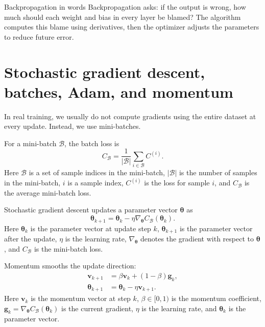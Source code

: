 \documentclass[11pt]{article}
\newcommand{\btheta}{\bm{\theta}}
\begin{document}
\begin{keybox}{Backpropagation in words}
Backpropagation asks: if the output is wrong, how much should each weight and bias in every layer be blamed?  The algorithm computes this blame using derivatives, then the optimizer adjusts the parameters to reduce future error.
\end{keybox}

\section{Stochastic gradient descent, batches, Adam, and momentum}

In real training, we usually do not compute gradients using the entire dataset at every update.  Instead, we use mini-batches.

For a mini-batch $\mathcal{B}$, the batch loss is
\begin{equation}
    C_{\mathcal{B}} = \frac{1}{|\mathcal{B}|}\sum_{i\in\mathcal{B}} C^{(i)}.
    \label{eq:batch_loss}
\end{equation}
Here $\mathcal{B}$ is a set of sample indices in the mini-batch, $|\mathcal{B}|$ is the number of samples in the mini-batch, $i$ is a sample index, $C^{(i)}$ is the loss for sample $i$, and $C_{\mathcal{B}}$ is the average mini-batch loss.

Stochastic gradient descent updates a parameter vector $\btheta$ as
\begin{equation}
    \btheta_{k+1}=\btheta_k-\eta\nabla_{\btheta} C_{\mathcal{B}}(\btheta_k).
    \label{eq:sgd_update}
\end{equation}
Here $\btheta_k$ is the parameter vector at update step $k$, $\btheta_{k+1}$ is the parameter vector after the update, $\eta$ is the learning rate, $\nabla_{\btheta}$ denotes the gradient with respect to $\btheta$, and $C_{\mathcal{B}}$ is the mini-batch loss.

Momentum smooths the update direction:
\begin{align}
    \bm{v}_{k+1} &= \beta \bm{v}_k + (1-\beta)\bm{g}_k, \label{eq:momentum_v}\\
    \btheta_{k+1} &= \btheta_k - \eta \bm{v}_{k+1}. \label{eq:momentum_update}
\end{align}
Here $\bm{v}_k$ is the momentum vector at step $k$, $\beta\in[0,1)$ is the momentum coefficient, $\bm{g}_k=\nabla_{\btheta}C_{\mathcal{B}}(\btheta_k)$ is the current gradient, $\eta$ is the learning rate, and $\btheta_k$ is the parameter vector.
\end{document}
